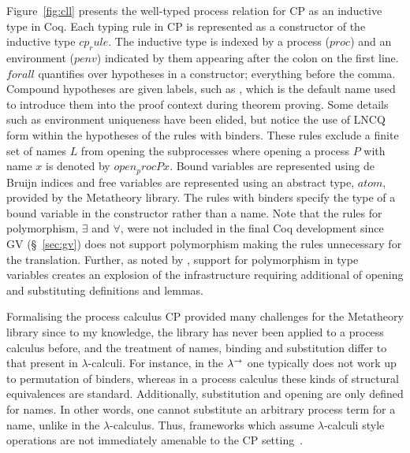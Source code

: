 Figure~\ref{fig:cll} presents the well-typed process relation for CP as an
inductive type in Coq. Each typing rule in CP is represented as a constructor
of the inductive type \coqe$cp_rule$. The inductive type is indexed by a
process (\coqe$proc$) and an environment (\coqe$penv$) indicated by them
appearing after the colon on the first line. \coqe$forall$ quantifies over
hypotheses in a constructor; everything before the comma. Compound hypotheses
are given labels, such as , which is the default name used to
introduce them into the proof context during theorem proving. Some details
such as environment uniqueness have been elided, but notice the use of LNCQ
form within the hypotheses of the rules with binders. These rules exclude a
finite set of names \coqe$L$ from opening the subprocesses where opening a
process \coqe$P$ with name \coqe$x$ is denoted by \coqe$open_proc P x$. Bound
variables are represented using de Bruijn indices and free variables are
represented using an abstract type, \coqe$atom$, provided by the Metatheory
library. The rules with binders specify the type of a bound variable in the
constructor rather than a name. Note that the rules for polymorphism,
$\exists$ and $\forall$, were not included in the final Coq development since
GV (\S~\ref{sec:gv}) does not support polymorphism making the rules
unnecessary for the translation. Further, as noted by \citeauthor{Lee:2012},
support for polymorphism in type variables creates an explosion of the
infrastructure requiring additional of opening and substituting definitions
and lemmas.

Formalising the process calculus CP provided many challenges for the
Metatheory library since to my knowledge, the library has never been applied
to a process calculus before, and the treatment of names, binding and
substitution differ to that present in $\lambda$-calculi. For instance, in the
$\lambda^\rightarrow$ one typically does not work up to permutation of binders, whereas in a
process calculus these kinds of structural equivalences are
standard. Additionally, substitution and opening are only defined for
names. In other words, one cannot substitute an arbitrary process term for a
name, unlike in the $\lambda$-calculus. Thus, frameworks which assume
$\lambda$-calculi style operations are not immediately amenable to the CP
setting~\cite{Lee:2012}.

